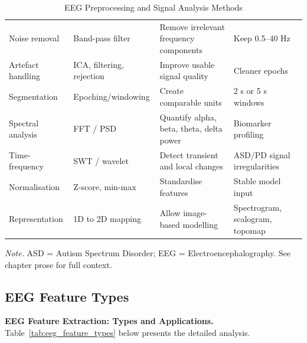 {\tablestripes\tablefontsize
{}
\begin{xltabular}{\textwidth}{@{} >{\raggedright\arraybackslash}p{2.2cm} >{\raggedright\arraybackslash}p{2.4cm} L L @{}}
\caption[EEG Preprocessing and Signal Analysis Methods]{EEG Preprocessing and Signal Analysis Methods}\label{tab:eeg_preprocessing} \\
\toprule
{} &  &  &  \\
\midrule
\endfirsthead
\endhead
\bottomrule
\endlastfoot
Noise removal & Band-pass filter & Remove irrelevant frequency components & Keep 0.5--40 Hz \\
Artefact handling & ICA, filtering, rejection & Improve usable signal quality & Cleaner epochs \\
Segmentation & Epoching/windowing & Create comparable units & 2 s or 5 s windows \\
Spectral analysis & FFT / PSD & Quantify alpha, beta, theta, delta power & Biomarker profiling \\
Time-frequency & SWT / wavelet & Detect transient and local changes & ASD/PD signal irregularities \\
Normalisation & Z-score, min-max & Standardise features & Stable model input \\
Representation & 1D to 2D mapping & Allow image-based modelling & Spectrogram, scalogram, topomap \\
\end{xltabular}}
\vspace{0.3em}\noindent\textit{Note.} ASD = Autism Spectrum Disorder; EEG = Electroencephalography. See chapter prose for full context.

\subsection{EEG Feature Types}\label{sec:appendix_ch3_eeg_feature_types}

\noindent\textbf{EEG Feature Extraction: Types and Applications.} Table~\ref{tab:eeg_feature_types} below presents the detailed analysis.


